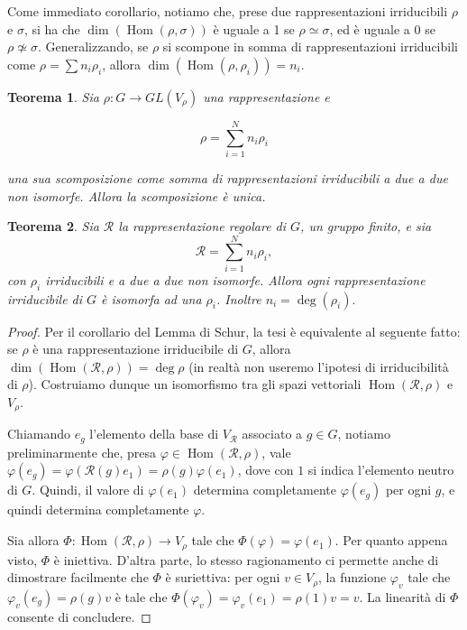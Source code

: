 \documentclass[11pt]{article}
\theoremstyle{plain}
\newtheorem{thm}{Teorema}[section]
\theoremstyle{definition}
\theoremstyle{remark}
\newcommand{\dsum}{\displaystyle\sum}
\DeclareMathOperator{\Hom}{Hom}
\begin{document}
Come immediato corollario, notiamo che, prese due rappresentazioni irriducibili $\rho$ e $\sigma$, si ha che $\dim\left(\Hom(\rho,\sigma)\right)$ è uguale a 1 se $\rho\simeq\sigma$, ed è uguale a 0 se $\rho\not\simeq\sigma$. Generalizzando, se $\rho$ si scompone in somma di rappresentazioni irriducibili come $\rho=\sum n_i\rho_i$, allora $\dim\left(\Hom(\rho,\rho_i)\right)=n_i$.



\begin{thm}
Sia $\rho: G \to GL(V_\rho)$ una rappresentazione e

\[\rho = \dsum_{i=1}^N n_i \rho_i \]

una sua scomposizione come somma di rappresentazioni irriducibili a due a due non isomorfe. Allora la scomposizione è unica.
\end{thm}






\begin{thm}
Sia $\mathcal{R}$ la rappresentazione regolare di $G$, un gruppo finito, e sia
\[ \mathcal{R} = \dsum_{i=1}^Nn_i \rho_i,\]
con $\rho_i$ irriducibili e a due a due non isomorfe. Allora ogni rappresentazione irriducibile di $G$ è isomorfa ad una $\rho_i$. Inoltre $n_i = \deg(\rho_i).$
\label{thm: teorema importantissimo}
\end{thm}
\begin{proof}
Per il corollario del Lemma di Schur, la tesi è equivalente al seguente fatto: se $\rho$ è una rappresentazione irriducibile di $G$, allora $\dim\left(\Hom(\mathcal{R},\rho)\right)=\deg\rho$ (in realtà non useremo l'ipotesi di irriducibilità di $\rho$). Costruiamo dunque un isomorfismo tra gli spazi vettoriali $\Hom(\mathcal{R},\rho)$ e $V_\rho$.

Chiamando $e_g$ l'elemento della base di $V_\mathcal{R}$ associato a $g\in G$, notiamo preliminarmente che, presa $\varphi\in\Hom(\mathcal{R},\rho)$, vale $\varphi(e_g)=\varphi(\mathcal{R}(g)e_{1})=\rho(g)\varphi(e_1)$, dove con $1$ si indica l'elemento neutro di $G$. Quindi, il valore di $\varphi(e_1)$ determina completamente $\varphi(e_g)$ per ogni $g$, e quindi determina completamente $\varphi$.

Sia allora $\Phi\colon\Hom(\mathcal{R},\rho)\to V_\rho$ tale che $\Phi(\varphi)=\varphi(e_{1})$. Per quanto appena visto, $\Phi$ è iniettiva. D'altra parte, lo stesso ragionamento ci permette anche di dimostrare facilmente che $\Phi$ è suriettiva: per ogni $v\in V_\rho$, la funzione $\varphi_v$ tale che $\varphi_v(e_g)=\rho(g)v$ è tale che $\Phi(\varphi_v)=\varphi_v(e_1)=\rho(1)v=v$. La linearità di $\Phi$ consente di concludere.
\end{proof}
\end{document}
